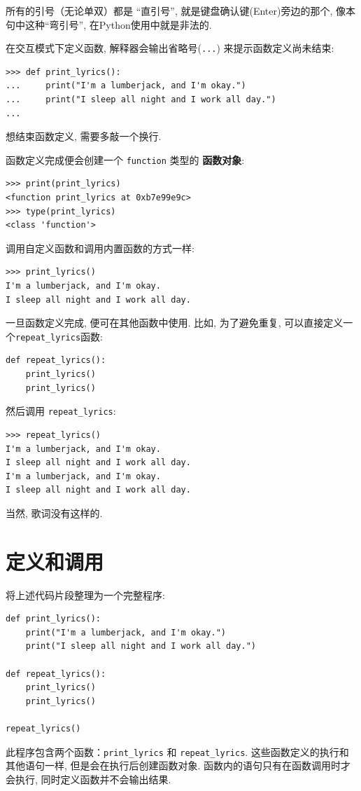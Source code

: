 \documentclass[10pt]{book}
\begin{document}
所有的引号（无论单双）都是 ``直引号'', 就是键盘确认键(Enter)旁边的那个, 
像本句中这种``弯引号'', 在Python使用中就是非法的. 

在交互模式下定义函数, 解释器会输出省略号({\tt ...}) 来提示函数定义尚未结束:

\begin{verbatim}
>>> def print_lyrics():
...     print("I'm a lumberjack, and I'm okay.")
...     print("I sleep all night and I work all day.")
...
\end{verbatim}
%
想结束函数定义, 需要多敲一个换行. 

函数定义完成便会创建一个 \verb"function" 类型的 {\bf 函数对象}:

\begin{verbatim}
>>> print(print_lyrics)
<function print_lyrics at 0xb7e99e9c>
>>> type(print_lyrics)
<class 'function'>
\end{verbatim}
%
调用自定义函数和调用内置函数的方式一样:

\begin{verbatim}
>>> print_lyrics()
I'm a lumberjack, and I'm okay.
I sleep all night and I work all day.
\end{verbatim}
%
一旦函数定义完成, 便可在其他函数中使用. 比如, 为了避免重复, 
可以直接定义一个\verb"repeat_lyrics"函数:

\begin{verbatim}
def repeat_lyrics():
    print_lyrics()
    print_lyrics()
\end{verbatim}
%
然后调用 \verb"repeat_lyrics":

\begin{verbatim}
>>> repeat_lyrics()
I'm a lumberjack, and I'm okay.
I sleep all night and I work all day.
I'm a lumberjack, and I'm okay.
I sleep all night and I work all day.
\end{verbatim}
%
当然, 歌词没有这样的. 

\section{定义和调用}

将上述代码片段整理为一个完整程序:

\begin{verbatim}
def print_lyrics():
    print("I'm a lumberjack, and I'm okay.")
    print("I sleep all night and I work all day.")

def repeat_lyrics():
    print_lyrics()
    print_lyrics()

repeat_lyrics()
\end{verbatim}
%
此程序包含两个函数：\verb"print_lyrics" 和 \verb"repeat_lyrics". 
这些函数定义的执行和其他语句一样, 但是会在执行后创建函数对象. 
函数内的语句只有在函数调用时才会执行, 同时定义函数并不会输出结果. 
\end{document}
